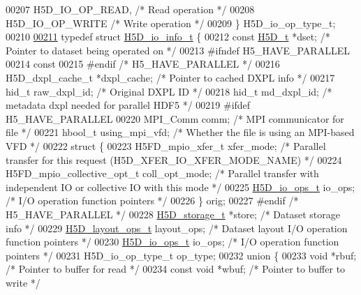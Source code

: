\begin{DoxyCode}
00207     H5D\_IO\_OP\_READ,         \textcolor{comment}{/* Read operation */}
00208     H5D\_IO\_OP\_WRITE         \textcolor{comment}{/* Write operation */}
00209 \} H5D\_io\_op\_type\_t;
00210 
\hyperlink{struct_h5_d__io__info__t}{00211} \textcolor{keyword}{typedef} \textcolor{keyword}{struct }\hyperlink{struct_h5_d__io__info__t}{H5D\_io\_info\_t} \{
00212     \textcolor{keyword}{const} \hyperlink{struct_h5_d__t}{H5D\_t} *dset;          \textcolor{comment}{/* Pointer to dataset being operated on */}
00213 \textcolor{preprocessor}{#ifndef H5\_HAVE\_PARALLEL}
00214     \textcolor{keyword}{const}
00215 \textcolor{preprocessor}{#endif }\textcolor{comment}{/* H5\_HAVE\_PARALLEL */}\textcolor{preprocessor}{}
00216         H5D\_dxpl\_cache\_t *dxpl\_cache; \textcolor{comment}{/* Pointer to cached DXPL info */}
00217     hid\_t raw\_dxpl\_id;          \textcolor{comment}{/* Original DXPL ID */}
00218     hid\_t md\_dxpl\_id;           \textcolor{comment}{/* metadata dxpl needed for parallel HDF5 */}
00219 \textcolor{preprocessor}{#ifdef H5\_HAVE\_PARALLEL}
00220     MPI\_Comm comm;              \textcolor{comment}{/* MPI communicator for file */}
00221     hbool\_t using\_mpi\_vfd;      \textcolor{comment}{/* Whether the file is using an MPI-based VFD */}
00222     \textcolor{keyword}{struct }\{
00223         H5FD\_mpio\_xfer\_t xfer\_mode; \textcolor{comment}{/* Parallel transfer for this request (H5D\_XFER\_IO\_XFER\_MODE\_NAME) */}
00224         H5FD\_mpio\_collective\_opt\_t coll\_opt\_mode; \textcolor{comment}{/* Parallel transfer with independent IO or collective IO
       with this mode */}
00225         \hyperlink{struct_h5_d__io__ops__t}{H5D\_io\_ops\_t} io\_ops;    \textcolor{comment}{/* I/O operation function pointers */}
00226     \} orig;
00227 \textcolor{preprocessor}{#endif }\textcolor{comment}{/* H5\_HAVE\_PARALLEL */}\textcolor{preprocessor}{}
00228     \hyperlink{union_h5_d__storage__t}{H5D\_storage\_t} *store;       \textcolor{comment}{/* Dataset storage info */}
00229     \hyperlink{struct_h5_d__layout__ops__t}{H5D\_layout\_ops\_t} layout\_ops;    \textcolor{comment}{/* Dataset layout I/O operation function pointers */}
00230     \hyperlink{struct_h5_d__io__ops__t}{H5D\_io\_ops\_t} io\_ops;        \textcolor{comment}{/* I/O operation function pointers */}
00231     H5D\_io\_op\_type\_t op\_type;
00232     \textcolor{keyword}{union }\{
00233         \textcolor{keywordtype}{void} *rbuf;             \textcolor{comment}{/* Pointer to buffer for read */}
00234         \textcolor{keyword}{const} \textcolor{keywordtype}{void} *wbuf;       \textcolor{comment}{/* Pointer to buffer to write */}

\end{DoxyCode}
